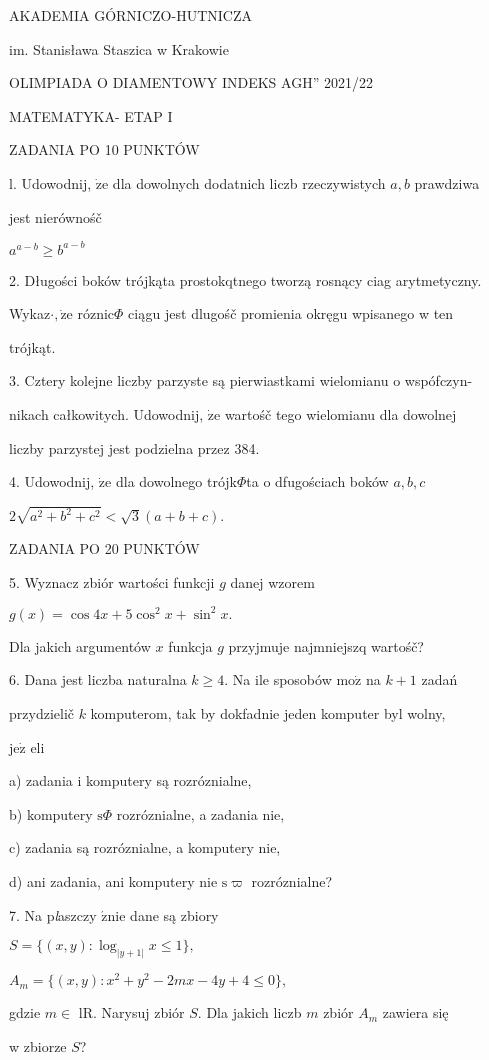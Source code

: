 \documentclass[a4paper,12pt]{article}
\begin{document}
AKADEMIA GÓRNICZO-HUTNICZA

im. Stanisława Staszica w Krakowie

OLIMPIADA O DIAMENTOWY INDEKS AGH'' 2021/22

MATEMATYKA- ETAP I

ZADANIA PO 10 PUNKTÓW

l. Udowodnij, $\dot{\mathrm{z}}\mathrm{e}$ dla dowolnych dodatnich liczb rzeczywistych $a, b$ prawdziwa

jest nierównośč

$a^{a-b}\geq b^{a-b}$

2. Długości boków trójkąta prostokqtnego tworzą rosnący ciag arytmetyczny.

Wykaz$\cdot, \dot{\mathrm{z}}\mathrm{e}$ róznic$\Phi$ ciągu jest dlugośč promienia okręgu wpisanego w ten

trójkąt.

3. Cztery kolejne liczby parzyste są pierwiastkami wielomianu o wspófczyn-

nikach całkowitych. Udowodnij, $\dot{\mathrm{z}}\mathrm{e}$ wartośč tego wielomianu dla dowolnej

liczby parzystej jest podzielna przez 384.

4. Udowodnij, $\dot{\mathrm{z}}\mathrm{e}$ dla dowolnego trójk$\Phi$ta o dfugościach boków $a, b, c$

$2\sqrt{a^{2}+b^{2}+c^{2}}<\sqrt{3}(a+b+c).$

ZADANIA PO 20 PUNKTÓW

5. Wyznacz zbiór wartości funkcji $g$ danej wzorem

$g(x)=\cos 4x+5\cos^{2}x+\sin^{2}x.$

Dla jakich argumentów $x$ funkcja $g$ przyjmuje najmniejszq wartośč?

6. Dana jest liczba naturalna $k \geq 4$. Na ile sposobów $\mathrm{m}\mathrm{o}\dot{\mathrm{z}}$ na $k+1$ zadań

przydzielič $k$ komputerom, tak by dokfadnie jeden komputer byl wolny,

$\mathrm{j}\mathrm{e}\dot{\mathrm{z}}$ eli

a) zadania i komputery są rozróznialne,

b) komputery $\mathrm{s}\Phi$ rozróznialne, a zadania nie,

c) zadania są rozróznialne, a komputery nie,

d) ani zadania, ani komputery nie $\mathrm{s}\varpi$ rozróznialne?

7. Na p{\it l}aszczy $\acute{\mathrm{z}}\mathrm{n}\mathrm{i}\mathrm{e}$ dane są zbiory

$S=\{(x,y):\log_{|y+1|}x\leq 1\},$

$A_{m}=\{(x,y):x^{2}+y^{2}-2mx-4y+4\leq 0\},$

gdzie $m \in$ lR. Narysuj zbiór $S$. Dla jakich liczb $m$ zbiór $A_{m}$ zawiera się

w zbiorze $S$?
\end{document}
